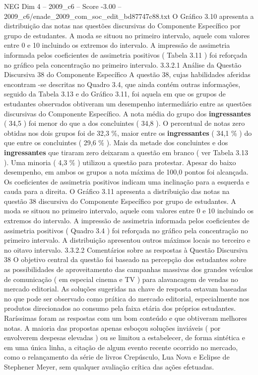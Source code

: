 \begin{textsample}{NEG Dim 4 – 2009\_c6 – Score -3.00 – 2009\_c6/enade\_2009\_com\_soc\_edit\_bd87747c88.txt}
O Gráfico 3.10 apresenta a distribuição das notas nas questões discursivas do Componente Específico por grupo de estudantes.
A moda se situou no primeiro intervalo, aquele com valores entre 0 e 10 incluindo os extremos do intervalo.
A impressão de assimetria informada pelos coeficientes de assimetria positivos ( Tabela 3.11 ) foi reforçada no gráfico pela concentração no primeiro intervalo. 3.3.2.1 Análise da Questão Discursiva 38 do Componente Específico A questão 38, cujas habilidades aferidas encontram -se descritas no Quadro 3.4, que ainda contém outras informações, seguido da Tabela 3.13 e do Gráfico 3.11, foi aquela em que os grupos de estudantes observados obtiveram um desempenho intermediário entre as questões discursivas do Componente Específico.
A nota média do grupo dos \textbf{ingressantes} ( 34,5 ) foi menor do que a dos concluintes ( 34,8 ).
O percentual de notas zero obtidas nos dois grupos foi de 32,3 \%, maior entre os \textbf{ingressantes} ( 34,1 \% ) do que entre os concluintes ( 29,6 \% ).
Mais da metade dos concluintes e dos \textbf{ingressantes} que tiraram zero deixaram a questão em branco ( ver Tabela 3.13 ).
Uma minoria ( 4,3 \% ) utilizou a questão para protestar.
Apesar do baixo desempenho, em ambos os grupos a nota máxima de 100,0 pontos foi alcançada.
Os coeficientes de assimetria positivos indicam uma inclinação para a esquerda e cauda para a direita.
O Gráfico 3.11 apresenta a distribuição das notas na questão 38 discursiva do Componente Específico por grupo de estudantes.
A moda se situou no primeiro intervalo, aquele com valores entre 0 e 10 incluindo os extremos do intervalo.
A impressão de assimetria informada pelos coeficientes de assimetria positivos ( Quadro 3.4 ) foi reforçada no gráfico pela concentração no primeiro intervalo.
A distribuição apresentou outros máximos locais no terceiro e no oitavo intervalo. 3.3.2.2 Comentários sobre as respostas à Questão Discursiva 38 O objetivo central da questão foi baseado na percepção dos estudantes sobre as possibilidades de aproveitamento das campanhas massivas dos grandes veículos de comunicação ( em especial cinema e TV ) para alavancagem de vendas no mercado editorial.
As soluções sugeridas na chave de resposta estavam baseadas no que pode ser observado como prática do mercado editorial, especialmente nos produtos direcionados ao consumo pela faixa etária dos próprios estudantes.
Raríssimas foram as respostas com um bom conteúdo e que obtiveram melhores notas.
A maioria das propostas apenas esboçou soluções inviáveis ( por envolverem despesas elevadas ) ou se limitou a estabelecer, de forma sintética e em uma única linha, a citação de algum evento recente ocorrido no mercado, como o relançamento da série de livros Crepúsculo, Lua Nova e Eclipse de Stephener Meyer, sem qualquer avaliação crítica das ações efetuadas.

\end{textsample}

